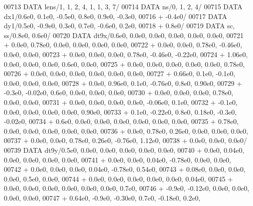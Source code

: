 \begin{DoxyCode}
00713       \textcolor{keyword}{DATA}              lens/1, 1, 2, 4, 1, 1, 3, 7/
00714       \textcolor{keyword}{DATA}              ns/0, 1, 2, 4/
00715       \textcolor{keyword}{DATA}              dx1/0.6e0, 0.1e0, -0.5e0, 0.8e0, 0.9e0, -0.3e0,
00716      +                  -0.4e0/
00717       \textcolor{keyword}{DATA}              dy1/0.5e0, -0.9e0, 0.3e0, 0.7e0, -0.6e0, 0.2e0,
00718      +                  0.8e0/
00719       \textcolor{keyword}{DATA}              sc, ss/0.8e0, 0.6e0/
00720       \textcolor{keyword}{DATA}              dt9x/0.6e0, 0.0e0, 0.0e0, 0.0e0, 0.0e0, 0.0e0,
00721      +                  0.0e0, 0.78e0, 0.0e0, 0.0e0, 0.0e0, 0.0e0,
00722      +                  0.0e0, 0.0e0, 0.78e0, -0.46e0, 0.0e0, 0.0e0,
00723      +                  0.0e0, 0.0e0, 0.0e0, 0.78e0, -0.46e0, -0.22e0,
00724      +                  1.06e0, 0.0e0, 0.0e0, 0.0e0, 0.6e0, 0.0e0,
00725      +                  0.0e0, 0.0e0, 0.0e0, 0.0e0, 0.0e0, 0.78e0,
00726      +                  0.0e0, 0.0e0, 0.0e0, 0.0e0, 0.0e0, 0.0e0,
00727      +                  0.66e0, 0.1e0, -0.1e0, 0.0e0, 0.0e0, 0.0e0,
00728      +                  0.0e0, 0.96e0, 0.1e0, -0.76e0, 0.8e0, 0.90e0,
00729      +                  -0.3e0, -0.02e0, 0.6e0, 0.0e0, 0.0e0, 0.0e0,
00730      +                  0.0e0, 0.0e0, 0.0e0, 0.78e0, 0.0e0, 0.0e0,
00731      +                  0.0e0, 0.0e0, 0.0e0, 0.0e0, -0.06e0, 0.1e0,
00732      +                  -0.1e0, 0.0e0, 0.0e0, 0.0e0, 0.0e0, 0.90e0,
00733      +                  0.1e0, -0.22e0, 0.8e0, 0.18e0, -0.3e0, -0.02e0,
00734      +                  0.6e0, 0.0e0, 0.0e0, 0.0e0, 0.0e0, 0.0e0, 0.0e0,
00735      +                  0.78e0, 0.0e0, 0.0e0, 0.0e0, 0.0e0, 0.0e0,
00736      +                  0.0e0, 0.78e0, 0.26e0, 0.0e0, 0.0e0, 0.0e0,
00737      +                  0.0e0, 0.0e0, 0.78e0, 0.26e0, -0.76e0, 1.12e0,
00738      +                  0.0e0, 0.0e0, 0.0e0/
00739       \textcolor{keyword}{DATA}              dt9y/0.5e0, 0.0e0, 0.0e0, 0.0e0, 0.0e0, 0.0e0,
00740      +                  0.0e0, 0.04e0, 0.0e0, 0.0e0, 0.0e0, 0.0e0,
00741      +                  0.0e0, 0.0e0, 0.04e0, -0.78e0, 0.0e0, 0.0e0,
00742      +                  0.0e0, 0.0e0, 0.0e0, 0.04e0, -0.78e0, 0.54e0,
00743      +                  0.08e0, 0.0e0, 0.0e0, 0.0e0, 0.5e0, 0.0e0,
00744      +                  0.0e0, 0.0e0, 0.0e0, 0.0e0, 0.0e0, 0.04e0,
00745      +                  0.0e0, 0.0e0, 0.0e0, 0.0e0, 0.0e0, 0.0e0, 0.7e0,
00746      +                  -0.9e0, -0.12e0, 0.0e0, 0.0e0, 0.0e0, 0.0e0,
00747      +                  0.64e0, -0.9e0, -0.30e0, 0.7e0, -0.18e0, 0.2e0,

\end{DoxyCode}
